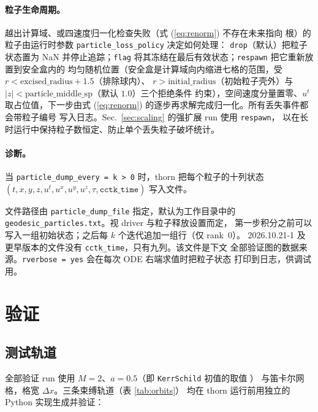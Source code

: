 \documentclass[11pt,UTF8]{ctexart}
\begin{document}
\paragraph{粒子生命周期。}
越出计算域、或四速度归一化检查失败（式 (\ref{eq:renorm}) 不存在未来指向
根）的粒子由运行时参数 \texttt{particle\_loss\_policy} 决定如何处理：
\texttt{drop}（默认）把粒子状态置为 NaN 并停止追踪；\texttt{flag}
将其冻结在最后有效状态；\texttt{respawn} 把它重新放置到安全盒内的
均匀随机位置（安全盒是计算域向内缩进七格的范围，受
$r < \mathrm{excised\_radius}+1.5$（排除球内）、
$r > \mathrm{initial\_radius}$（初始粒子壳外）与
$|z| < \mathrm{particle\_middle\_sp}$（默认 $1.0$）三个拒绝条件
约束），空间速度分量置零、$u^t$ 取占位值，下一步由式
(\ref{eq:renorm}) 的逐步再求解完成归一化。所有丢失事件都会带粒子编号
写入日志。Sec.~\ref{sec:scaling} 的强扩展 run 使用 \texttt{respawn}，
以在长时运行中保持粒子数恒定、防止单个丢失粒子破坏统计。

\paragraph{诊断。}
当 \texttt{particle\_dump\_every = k > 0} 时，thorn 把每个粒子的十列状态
$(t,x,y,z,\allowbreak u^t,u^x,u^y,u^z,\allowbreak \tau,\texttt{cctk\_time})$ 写入文件。

文件路径由 \texttt{particle\_dump\_file} 指定，默认为工作目录中的
\texttt{geodesic\_particles.txt}。视 driver 与粒子释放设置而定，
第一步积分之前可以写入一组初始状态；之后每 $k$ 个迭代追加一组行（仅 rank~0）。
2026.10.21-1 及更早版本的文件没有 \texttt{cctk\_time}，只有九列。该文件是下文
全部验证图的数据来源。\texttt{rverbose = yes} 会在每次 ODE 右端求值时把粒子状态
打印到日志，供调试用。

\section{验证}\label{sec:verification}

\subsection{测试轨道}

全部验证 run 使用 $M=2$、$a=0.5$（即 \texttt{KerrSchild} 初值的取值 \citep{moreno2002}）
与笛卡尔网格，格宽 $\Delta x$。三条束缚轨道（表 \ref{tab:orbits}）
均在 thorn 运行前用独立的 Python 实现生成并验证：
\end{document}

